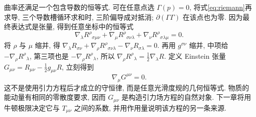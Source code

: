 曲率还满足一个包含导数的恒等式. 可在任意点选 $\Gamma(p)=0$, 将式\eqref{eq:riemann}再求导, 三个导数槽循环求和时, 三阶偏导成对抵消; $\partial(\Gamma\Gamma)$ 在该点也为零. 因为最终表达式是张量, 得到任意坐标中的恒等式
\begin{equation}\label{eq:differential-bianchi}
\nabla_\lambda R^\rho{}_{\sigma\mu\nu}
+\nabla_\mu R^\rho{}_{\sigma\nu\lambda}
+\nabla_\nu R^\rho{}_{\sigma\lambda\mu}=0.
\end{equation}
将 $\rho$ 与 $\mu$ 缩并, 得
$\nabla_\lambda R_{\sigma\nu}+\nabla_\rho R^\rho{}_{\sigma\nu\lambda}-\nabla_\nu R_{\sigma\lambda}=0$.
再用 $g^{\sigma\nu}$ 缩并, 中项给 $-\nabla_\rho R^\rho{}_{\lambda}$, 第三项也是 $-\nabla_\rho R^\rho{}_{\lambda}$, 所以
$\nabla_\rho R^\rho{}_{\lambda}=\frac12\nabla_\lambda R$.
定义 Einstein 张量 $G_{\mu\nu}=R_{\mu\nu}-\frac12g_{\mu\nu}R$, 立刻得到
\begin{equation}\label{eq:einstein-divergence}
\nabla_\mu G^{\mu\nu}=0.
\end{equation}
这不是使用引力方程后才成立的守恒律, 而是任意光滑度规的几何恒等式. 物质的能动量有相同的零散度要求, 因而 $G_{\mu\nu}$ 是构造引力场方程的自然对象. 下一章将用牛顿极限决定它与 $T_{\mu\nu}$ 之间的系数, 并用作用量说明该方程的另一条来源.

